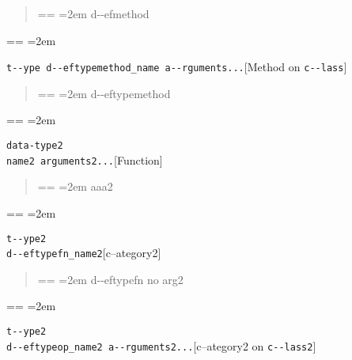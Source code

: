 \documentclass{book}
\makeatletter
\newenvironment{GNUTexinfopreformatted}{%
  \par\obeylines\obeyspaces\frenchspacing
  \parskip=\z@\parindent=\z@}{}
\makeatother
\begin{document}
%
\begin{quote}
\unskip{\parskip=0pt\noindent}%
\begin{GNUTexinfopreformatted}
\leftskip=2em\relax\ttfamily%
d{-}{-}efmethod
\end{GNUTexinfopreformatted}
\end{quote}
\begin{GNUTexinfopreformatted}
\leftskip=2em\relax\ttfamily%

\end{GNUTexinfopreformatted}
\noindent\texttt{t{-}{-}ype d{-}{-}eftypemethod\_name a{-}{-}rguments...}\hfill[Method on \texttt{c{-}{-}lass}]



%
\begin{quote}
\unskip{\parskip=0pt\noindent}%
\begin{GNUTexinfopreformatted}
\leftskip=2em\relax\ttfamily%
d{-}{-}eftypemethod
\end{GNUTexinfopreformatted}
\end{quote}
\begin{GNUTexinfopreformatted}
\leftskip=2em\relax\ttfamily%


\end{GNUTexinfopreformatted}
\noindent\texttt{data-type2\leavevmode{}\\name2 arguments2...}\hfill[Function]



%
\begin{quote}
\unskip{\parskip=0pt\noindent}%
\begin{GNUTexinfopreformatted}
\leftskip=2em\relax\ttfamily%
aaa2
\end{GNUTexinfopreformatted}
\end{quote}
\begin{GNUTexinfopreformatted}
\leftskip=2em\relax\ttfamily%

\end{GNUTexinfopreformatted}
\noindent\texttt{t{-}{-}ype2\leavevmode{}\\d{-}{-}eftypefn\_name2}\hfill[c--ategory2]



%
\begin{quote}
\unskip{\parskip=0pt\noindent}%
\begin{GNUTexinfopreformatted}
\leftskip=2em\relax\ttfamily%
d{-}{-}eftypefn no arg2
\end{GNUTexinfopreformatted}
\end{quote}
\begin{GNUTexinfopreformatted}
\leftskip=2em\relax\ttfamily%

\end{GNUTexinfopreformatted}
\noindent\texttt{t{-}{-}ype2\leavevmode{}\\d{-}{-}eftypeop\_name2 a{-}{-}rguments2...}\hfill[c--ategory2 on \texttt{c{-}{-}lass2}]
\end{document}
